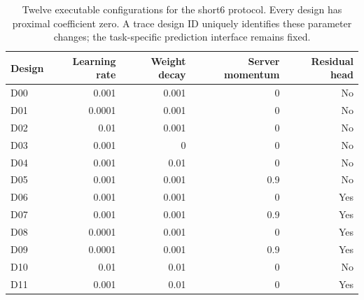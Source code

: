 \begin{table}[htbp]
\caption{Twelve executable configurations for the short6 protocol. Every design has proximal coefficient zero. A trace design ID uniquely identifies these parameter changes; the task-specific prediction interface remains fixed.}
\label{tab:completed-menu-short6}
\centering\small
\setlength{\tabcolsep}{4pt}
\begin{tabularx}{\linewidth}{@{}Xrrrr@{}}
\toprule
Design & Learning rate & Weight decay & Server momentum & Residual head \\
\midrule
D00 & 0.001 & 0.001 & 0 & No \\
D01 & 0.0001 & 0.001 & 0 & No \\
D02 & 0.01 & 0.001 & 0 & No \\
D03 & 0.001 & 0 & 0 & No \\
D04 & 0.001 & 0.01 & 0 & No \\
D05 & 0.001 & 0.001 & 0.9 & No \\
D06 & 0.001 & 0.001 & 0 & Yes \\
D07 & 0.001 & 0.001 & 0.9 & Yes \\
D08 & 0.0001 & 0.001 & 0 & Yes \\
D09 & 0.0001 & 0.001 & 0.9 & Yes \\
D10 & 0.01 & 0.01 & 0 & No \\
D11 & 0.001 & 0.01 & 0 & Yes \\
\bottomrule
\end{tabularx}
\end{table}
